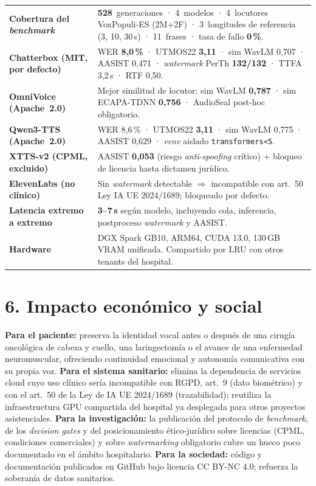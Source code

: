 \documentclass[11pt,a4paper]{article}
\begin{document}
\renewcommand{\arraystretch}{1.1}
\begin{tabularx}{\textwidth}{@{}lX@{}}
\textbf{Cobertura del \emph{benchmark}} & \textbf{528}~generaciones · 4~modelos · 4~locutores VoxPopuli-ES (2M+2F) · 3~longitudes de referencia (3, 10, 30\,s) · 11~frases · tasa de fallo \textbf{0\,\%}. \\
\textbf{Chatterbox (MIT, por defecto)} & WER \textbf{8{,}0\,\%} · UTMOS22 \textbf{3{,}11} · sim WavLM 0{,}707 · AASIST 0{,}471 · \emph{watermark} PerTh \textbf{132/132} · TTFA 3{,}2\,s · RTF 0{,}50. \\
\textbf{OmniVoice (Apache~2.0)} & Mejor similitud de locutor: sim WavLM \textbf{0{,}787} · sim ECAPA-TDNN \textbf{0{,}756} · AudioSeal post-hoc obligatorio. \\
\textbf{Qwen3-TTS (Apache~2.0)} & WER 8{,}6\,\% · UTMOS22 \textbf{3{,}11} · sim WavLM 0{,}775 · AASIST 0{,}629 · \emph{venv} aislado \texttt{transformers<5}. \\
\textbf{XTTS-v2 (CPML, excluido)} & AASIST \textbf{0{,}053} (riesgo \emph{anti-spoofing} crítico) + bloqueo de licencia hasta dictamen jurídico. \\
\textbf{ElevenLabs (no clínico)} & Sin \emph{watermark} detectable $\Rightarrow$ incompatible con art.~50 Ley IA UE 2024/1689; bloqueado por defecto. \\
\textbf{Latencia extremo a extremo} & \textbf{3--7\,s} según modelo, incluyendo cola, inferencia, postproceso \emph{watermark} y AASIST. \\
\textbf{Hardware} & DGX Spark GB10, ARM64, CUDA 13.0, 130\,GB VRAM unificada. Compartido por LRU con otros tenants del hospital. \\
\end{tabularx}

\section*{6. Impacto económico y social}

\textbf{Para el paciente:} preserva la identidad vocal antes o después de una cirugía oncológica de cabeza y cuello, una laringectomía o el avance de una enfermedad neuromuscular, ofreciendo continuidad emocional y autonomía comunicativa con su propia voz. \textbf{Para el sistema sanitario:} elimina la dependencia de servicios cloud cuyo uso clínico sería incompatible con RGPD, art.~9 (dato biométrico) y con el art.~50 de la Ley de IA UE 2024/1689 (trazabilidad); reutiliza la infraestructura GPU compartida del hospital ya desplegada para otros proyectos asistenciales. \textbf{Para la investigación:} la publicación del protocolo de \emph{benchmark}, de los \emph{decision gates} y del posicionamiento ético-jurídico sobre licencias (CPML, condiciones comerciales) y sobre \emph{watermarking} obligatorio cubre un hueco poco documentado en el ámbito hospitalario. \textbf{Para la sociedad:} código y documentación publicados en GitHub bajo licencia CC BY-NC 4.0; refuerza la soberanía de datos sanitarios.
\end{document}
